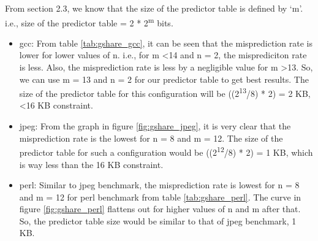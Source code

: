 From section 2.3, we know that the size of the predictor table is defined by `m'. i.e., size of the predictor table = 2 * 2\textsuperscript{m} bits.

\begin{itemize}
\item gcc: From table \ref{tab:gshare_gcc}, it can be seen that the misprediction rate is lower for lower values of n. i.e., for m \textless 14 and n = 2, the misprediciton rate is less. Also, the misprediction rate is less by a negligible value for m \textgreater 13. So, we can use m = 13 and n = 2 for our predictor table to get best results. The size of the predictor table for this configuration will be ((2\textsuperscript{13}/8) * 2) = 2 KB, \textless 16 KB constraint.

\item jpeg: From the graph in figure \ref{fig:gshare_jpeg}, it is very clear that the misprediction rate is the lowest for n = 8 and m = 12. The size of the predictor table for such a configuration would be ((2\textsuperscript{12}/8) * 2) = 1 KB, which is way less than the 16 KB constraint.

\item perl: Similar to jpeg benchmark, the misprediction rate is lowest for n = 8 and m = 12 for perl benchmark from table \ref{tab:gshare_perl}. The curve in figure \ref{fig:gshare_perl} flattens out for higher values of n and m after that. So, the predictor table size would be similar to that of jpeg benchmark, 1 KB.
\end{itemize}

